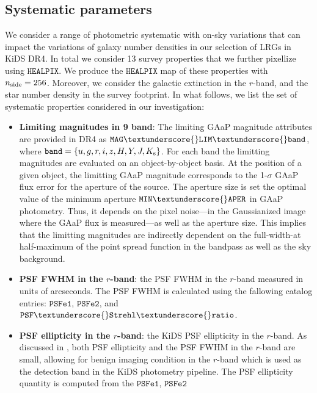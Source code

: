 \documentclass[fleqn,usenatbib,useAMS]{mnras}
\newcommand{\healpix}{\mathtt{HEALPIX}}
\begin{document}
\subsection{Systematic parameters}

We consider a range of photometric systematic with on-sky variations that can impact the variations of galaxy number densities in our selection of LRGs in KiDS DR4. In total we consider 13 survey properties that we further pixellize using $\healpix$. We produce the $\healpix$ map of these properties with $n_{\rm side} = 256$. Moreover, we consider the galactic extinction in the $r$-band, and the star number density in the survey footprint. In what follows, we list the set of systematic properties considered in our investigation:

\begin{itemize}

  \item \textbf{Limiting magnitudes in 9 band}: The limiting GAaP magnitude attributes are provided in DR4 as $\mathtt{MAG}\textunderscore{}\mathtt{LIM}\textunderscore{} \mathtt{band}$, where $\mathtt{band} = \{u,g,r,i,z,H,Y,J,K_{\rm s}\}$. 
  For each band the limitting magnitudes are evaluated on an object-by-object basis. At the position of a given object, the limitting GAaP magnitude corresponds to the 1-$\sigma$ GAaP flux error for the aperture of the source. The aperture size is set the optimal value of the minimum aperture $\mathtt{MIN}\textunderscore{}\mathtt{APER}$ in GAaP photometry. Thus, it depends on the pixel noise---in the Gaussianized image where the GAaP flux is measured---as well as the aperture size. This implies that the limitting magnitudes are indirectly dependent on the full-width-at half-maximum of the point spread function in the bandpass as well as the sky background.   
  
  \item \textbf{PSF FWHM in the $r$-band}: the PSF FWHM in the $r$-band measured in units of arcseconds. The PSF FWHM is calculated using the fallowing catalog entries: $\mathtt{PSFe1}$, $\mathtt{PSFe2}$, and $\mathtt{PSF \textunderscore{} Strehl \textunderscore{} ratio}$.
    
    \item \textbf{PSF ellipticity in the $r$-band}: the KiDS PSF ellipticity in the $r$-band. As discussed in \citet{kuijken2019}, both PSF ellipticity and the PSF FWHM in the $r$-band are small, allowing for benign imaging condition in the $r$-band which is used as the detection band in the KiDS photometry pipeline. 
    The PSF ellipticity quantity is computed from the $\mathtt{PSFe1}$, $\mathtt{PSFe2}$
  

\end{itemize}
\end{document}
